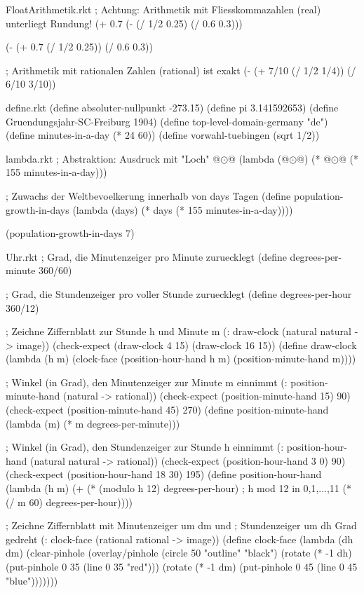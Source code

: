 \begin{filecontents*}{FloatArithmetik.rkt}
; Achtung: Arithmetik mit Fliesskommazahlen (real)
 unterliegt Rundung!
(+ 0.7
   (- (/ 1/2 0.25)
      (/ 0.6 0.3)))

(- (+ 0.7
      (/ 1/2 0.25))
   (/ 0.6 0.3))

; Arithmetik mit rationalen Zahlen (rational) ist exakt
(- (+ 7/10
      (/ 1/2 1/4))
   (/ 6/10 3/10))
\end{filecontents*}
\begin{filecontents*}{define.rkt}
(define absoluter-nullpunkt -273.15)
(define pi 3.141592653)
(define Gruendungsjahr-SC-Freiburg 1904)
(define top-level-domain-germany "de")
(define minutes-in-a-day (* 24 60))
(define vorwahl-tuebingen (sqrt 1/2))
\end{filecontents*}
\begin{filecontents*}{lambda.rkt}
; Abstraktion: Ausdruck mit "Loch" @$\odot$@
(lambda (@$\odot$@) (* @$\odot$@ (* 155 minutes-in-a-day)))


; Zuwachs der Weltbevoelkerung innerhalb von days Tagen
(define population-growth-in-days
    (lambda (days) (* days (* 155 minutes-in-a-day))))

(population-growth-in-days 7)
\end{filecontents*}
\begin{filecontents*}{Uhr.rkt}
; Grad, die Minutenzeiger pro Minute zuruecklegt
(define degrees-per-minute 360/60)

; Grad, die Stundenzeiger pro voller Stunde zuruecklegt
(define degrees-per-hour 360/12)

; Zeichne Ziffernblatt zur Stunde h und Minute m
(: draw-clock (natural natural -> image))
(check-expect (draw-clock 4 15) (draw-clock 16 15))
(define draw-clock
  (lambda (h m)
    (clock-face (position-hour-hand h m)  
    	(position-minute-hand m))))

; Winkel (in Grad), den Minutenzeiger zur Minute m einnimmt
(: position-minute-hand (natural -> rational))
(check-expect (position-minute-hand 15) 90)
(check-expect (position-minute-hand 45) 270)
(define position-minute-hand
  (lambda (m)
    (* m degrees-per-minute)))

; Winkel (in Grad), den Stundenzeiger zur Stunde h einnimmt
(: position-hour-hand (natural natural -> rational))
(check-expect (position-hour-hand 3 0) 90)
(check-expect (position-hour-hand 18 30) 195)
(define position-hour-hand
  (lambda (h m)
    (+ (* (modulo h 12) degrees-per-hour)
    ; h mod 12 in {0,1,...,11}
       (* (/ m 60) degrees-per-hour))))

; Zeichne Ziffernblatt mit Minutenzeiger um dm und
; Stundenzeiger um dh Grad gedreht
(: clock-face (rational rational -> image))
(define clock-face
  (lambda (dh dm)
    (clear-pinhole
     (overlay/pinhole
      (circle 50 "outline" "black")
      (rotate (* -1 dh) (put-pinhole 0 35 (line 0 35 "red")))
      (rotate (* -1 dm) (put-pinhole 0 45 (line 0 45 "blue")))))))
\end{filecontents*}

